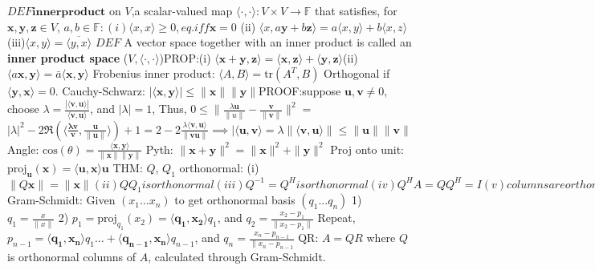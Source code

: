 \documentclass[8pt]{extarticle}
\theoremstyle{definition}
\begin{document}
{
$DEF \mathbf{innerproduct}$ on $V$,a scalar-valued map $\langle \cdot,\cdot \rangle: V\times V \to \mathbb{F}$ that satisfies, for $\mathbf{x,y,z} \in V$, $a,b \in \mathbb{F}: (i) \langle x,x \rangle \geq 0, eq. iff \mathbf{x} =0 $
(ii) $\langle x,a \mathbf{y} + b \mathbf{z}  \rangle = a \langle x,y \rangle + b \langle x,z \rangle$
(iii)$ \langle x,y \rangle = \overline { \langle y,x \rangle }$
$DEF$ A vector space together with an inner product is called an \textbf{inner product space} ($V, \langle \cdot,\cdot \rangle$)PROP:(i)
$\langle \mathbf{x + y}, \mathbf{z} \rangle = \langle \mathbf{x}, \mathbf{z} \rangle + \langle \mathbf{y}, \mathbf{z} \rangle 
$(ii)$ \langle a\mathbf{x}, \mathbf{y} \rangle = \bar a \langle \mathbf{x}, \mathbf{y} \rangle $
Frobenius inner product: $\langle A, B \rangle = \text{tr}(A^T,B)$
Orthogonal if $\langle \mathbf{y}, \mathbf{x} \rangle = 0$.
Cauchy-Schwarz: $|\langle \mathbf{x}, \mathbf{y} \rangle | \leq \|\mathbf{x}\| \|\mathbf{y}\|$PROOF:suppose $\mathbf{u}, \mathbf{v} \neq 0$, choose
$\lambda = \frac{|\langle \mathbf{v}, \mathbf{u} \rangle |}{\langle \mathbf{v}, \mathbf{u} \rangle }$, and $|\lambda| = 1$,
Thus, $0 \leq \| \frac{\lambda \mathbf{u}}{\|u\|} - \frac{\mathbf{v}}{\|\mathbf{v}\|}\|^2 = $
$|\lambda|^2 -2 \Re(\langle \mathbf{\frac{\lambda \mathbf{v}}{\mathbf{v}}},
\frac{\mathbf{u}}{\|\mathbf{u}\|} \rangle ) + 1 = 2 - 2 \frac{\lambda \langle \mathbf{v}, \mathbf{u} \rangle }{\|\mathbf{v}\mathbf{u}\|} \implies |\langle \mathbf{u}, \mathbf{v} \rangle 
= \lambda \| \langle \mathbf{v}, \mathbf{u} \rangle \| \leq \|\mathbf{u}\| \| \mathbf{v}\|$ 
Angle: $ \text{cos}(\theta) = \frac{\langle \mathbf{x}, \mathbf{y} \rangle }{\| \mathbf{x}\| \|\mathbf{y}\|}$ 
Pyth: $\|\mathbf{x}+ \mathbf{y}\|^2 = \|\mathbf{x}\|^2 + \|\mathbf{y}\|^2$
Proj onto unit: $\text{proj}_\mathbf{u}(\mathbf{x}) = \langle \mathbf{u}, \mathbf{x} \rangle \mathbf{u}$
THM: $Q$, $Q_1$ orthonormal: (i) $\|Q \mathbf{x}\| = \|\mathbf{x}\| 
(ii) QQ_1 is orthonormal
(iii) Q^{-1} = Q^H is orthonormal
(iv) Q^HA = QQ^H = I
(v) columns are orthonormal
(vi) |det(Q)| = 1$
Gram-Schmidt: Given $(x_1\dots x_n)$ to get orthonormal basis $(q_1 \dots q_n)$ 1) $q_1 = \frac{x}{\|x\|}$ 
2) $p_1 = \text{proj}_{q_1}(x_2) = \langle \mathbf{q_1}, \mathbf{x_2} \rangle q_1$,
and $q_2 = \frac{x_2 - p_1}{\|x_2 - p_1\|}$
Repeat, $p_{n-1} = \langle \mathbf{q_1}, \mathbf{x_n} \rangle q_1 \dots + \langle \mathbf{q_{n-1}}, \mathbf{x_n} \rangle q_{n-1}$, and $ q_n = \frac{x_n - p_{n-1}}{\|x_n - p_{n-1}}$
QR: $A=QR$ where $Q$ is orthonormal columns of $A$, calculated through Gram-Schmidt.
}
\end{document}
